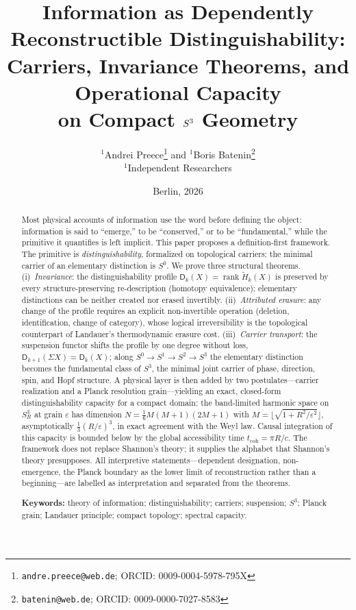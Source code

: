 \documentclass[11pt,a4paper]{article}
\title{\bfseries Information as Dependently Reconstructible Distinguishability:\\
Carriers, Invariance Theorems, and Operational Capacity\\
on Compact \texorpdfstring{$\Sthree$}{S3} Geometry}
\author{%
\texorpdfstring{$^{1}$}{1}Andrei Preece\thanks{\texttt{andre.preece@web.de}; ORCID: 0009-0004-5978-795X}
\quad and \quad
\texorpdfstring{$^{1}$}{1}Boris Batenin\thanks{\texttt{batenin@web.de}; ORCID: 0009-0000-7027-8583}\\[0.35em]
\small \texorpdfstring{$^{1}$}{1}Independent Researchers
}
\date{Berlin, 2026}
\theoremstyle{definition}
\theoremstyle{remark}
\newcommand{\Szero}{S^{0}}
\newcommand{\Sone}{S^{1}}
\newcommand{\Stwo}{S^{2}}
\newcommand{\Sthree}{S^{3}}
\newcommand{\rH}{\widetilde H}
\newcommand{\Dd}{\mathsf{D}}
\begin{document}
\maketitle

\begin{abstract}
Most physical accounts of information use the word before defining the object: information is
said to ``emerge,'' to be ``conserved,'' or to be ``fundamental,'' while the primitive it
quantifies is left implicit.  This paper proposes a definition-first framework.  The primitive is
\emph{distinguishability}, formalized on topological carriers; the minimal carrier of an
elementary distinction is $\Szero$.  We prove three structural theorems.  (i)~\emph{Invariance}:
the distinguishability profile $\Dd_{k}(X)=\operatorname{rank}\rH_{k}(X)$ is preserved by every
structure-preserving re-description (homotopy equivalence); elementary distinctions can be
neither created nor erased invertibly.  (ii)~\emph{Attributed erasure}: any change of the profile
requires an explicit non-invertible operation (deletion, identification, change of category),
whose logical irreversibility is the topological counterpart of Landauer's thermodynamic erasure
cost.  (iii)~\emph{Carrier transport}: the suspension functor shifts the profile by one degree
without loss, $\Dd_{k+1}(\Sigma X)=\Dd_{k}(X)$; along
$\Szero\to\Sone\to\Stwo\to\Sthree$ the elementary distinction becomes the fundamental class of
$\Sthree$, the minimal joint carrier of phase, direction, spin, and Hopf structure.  A physical
layer is then added by two postulates---carrier realization and a Planck resolution
grain---yielding an exact, closed-form distinguishability capacity for a compact domain: the
band-limited harmonic space on $\Sthree_{R}$ at grain $\varepsilon$ has dimension
$N=\tfrac16 M(M+1)(2M+1)$ with $M=\lfloor\sqrt{1+R^{2}/\varepsilon^{2}}\rfloor$, asymptotically
$\tfrac13(R/\varepsilon)^{3}$, in exact agreement with the Weyl law.  Causal integration of this
capacity is bounded below by the global accessibility time $t_{\mathrm{coh}}=\pi R/c$.  The
framework does not replace Shannon's theory; it supplies the alphabet that Shannon's theory
presupposes.  All interpretive statements---dependent designation, non-emergence, the Planck
boundary as the lower limit of reconstruction rather than a beginning---are labelled as
interpretation and separated from the theorems.
\medskip

\noindent\textbf{Keywords:} theory of information; distinguishability; carriers; suspension;
$\Sthree$; Planck grain; Landauer principle; compact topology; spectral capacity.
\end{abstract}
\end{document}
